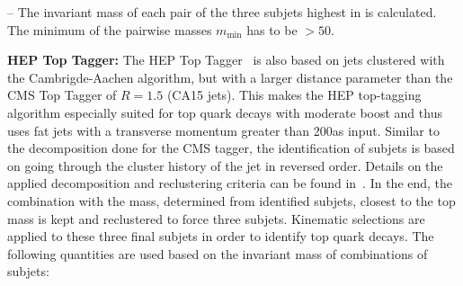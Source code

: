 \begin{description}
\begin{description}
 \item -- The invariant mass of each pair of the three subjets highest in \pt is calculated. The minimum of the pairwise masses $m_{\mathrm{min}}$ has to be $ > 50$\gev.
\end{description}
 \item \textbf{HEP Top Tagger:} The HEP Top Tagger~\cite{Plehn:2010st} is also based on jets clustered with the Cambrigde-Aachen algorithm, but with a larger distance parameter than the CMS Top Tagger of $R = 1.5$ (CA15 jets). This makes the HEP top-tagging algorithm especially suited for top quark decays with moderate boost and thus uses fat jets with a transverse momentum greater than 200\gev as input. %
Similar to the decomposition done for the CMS tagger, the identification of subjets is based on going through the cluster history of the jet in reversed order. %
Details on the applied decomposition and reclustering criteria can be found in~\cite{CMS-PAS-JME-13-007}. In the end, the combination with the mass, determined from identified subjets, closest to the top mass is kept and reclustered to force three subjets. Kinematic selections are applied to these three final subjets in order to identify top quark decays. The following quantities are used based on the invariant mass of combinations of subjets:

\end{description}
